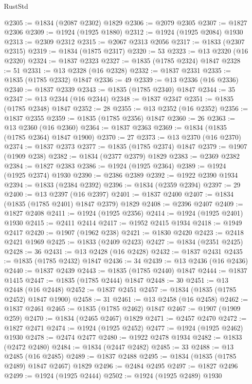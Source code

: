 \begin{lexlean}{RustStd}
\begin{coremodule}
@2305 := @1834 (@2087 @2302) @1829
@2306 := @2079 @2305
@2307 := @1827 @2306
@2309 := @1924 (@1925 @1880)
@2312 := @1924 (@1925 @2084) @1930
@2313 := @2309 @2312
@2315 := @2067 @2313 @2056
@2317 := @1833 (@2307 @2315)
@2319 := @1834 (@1875 @2317)
@2320 := 53
@2323 := @13 @2320 (@16 @2320)
@2324 := @1837 @2323
@2327 := @1835 (@1785 @2324) @1847
@2328 := 51
@2331 := @13 @2328 (@16 @2328)
@2332 := @1837 @2331
@2335 := @1835 (@1785 @2332) @1847
@2336 := 49
@2339 := @13 @2336 (@16 @2336)
@2340 := @1837 @2339
@2343 := @1835 (@1785 @2340) @1847
@2344 := 35
@2347 := @13 @2344 (@16 @2344)
@2348 := @1837 @2347
@2351 := @1835 (@1785 @2348) @1847
@2352 := 28
@2355 := @13 @2352 (@16 @2352)
@2356 := @1837 @2355
@2359 := @1835 (@1785 @2356) @1847
@2360 := 26
@2363 := @13 @2360 (@16 @2360)
@2364 := @1837 @2363
@2369 := @1834 (@1835 (@1785 @2364) @1847 @1900)
@2370 := 27
@2373 := @13 @2370 (@16 @2370)
@2374 := @1837 @2373
@2377 := @1835 (@1785 @2374) @1847
@2379 := @1907 (@1909 @238)
@2382 := @1834 (@2377 @2379) @1829
@2383 := @2369 @2382
@2384 := @1827 @2383
@2386 := @1924 (@1925 @2364)
@2389 := @1924 (@1925 @2374) @1930
@2390 := @2386 @2389
@2392 := @1922 @2390 @1934
@2394 := @1833 (@2384 @2392)
@2396 := @1834 (@2359 @2394)
@2397 := 29
@2400 := @13 @2397 (@16 @2397)
@2401 := @1837 @2400
@2407 := @1834 (@1835 (@1785 @2401) @1847 @2379) @1829
@2408 := @2396 @2407
@2409 := @1827 @2408
@2411 := @1924 (@1925 @2356)
@2414 := @1924 (@1925 @2401) @1930
@2415 := @2411 @2414
@2417 := @1952 @2415 @1934
@2418 := @1949 @2417
@2420 := @1907 (@1962 @238)
@2421 := @1830 @2420
@2423 := @2418 @2421 @1969
@2425 := @1833 (@2409 @2423)
@2427 := @1834 (@2351 @2425)
@2428 := 36
@2431 := @13 @2428 (@16 @2428)
@2432 := @1837 @2431
@2435 := @1835 (@1785 @2432) @1847
@2436 := 34
@2439 := @13 @2436 (@16 @2436)
@2440 := @1837 @2439
@2443 := @1835 (@1785 @2440) @1847
@2444 := @1837 @1415
@2447 := @1835 (@1785 @2444) @1847
@2448 := 30
@2451 := @13 @2448 (@16 @2448)
@2452 := @1837 @2451
@2457 := @1834 (@1835 (@1785 @2452) @1847 @1900)
@2458 := 31
@2461 := @13 @2458 (@16 @2458)
@2462 := @1837 @2461
@2465 := @1835 (@1785 @2462) @1847
@2467 := @1907 (@1909 @259)
@2470 := @1834 (@2465 @2467) @1829
@2471 := @2457 @2470
@2472 := @1827 @2471
@2474 := @1924 (@1925 @2452)
@2477 := @1924 (@1925 @2462) @1930
@2478 := @2474 @2477
@2480 := @1922 @2478 @1934
@2482 := @1833 (@2472 @2480)
@2484 := @1834 (@2447 @2482)
@2485 := 33
@2488 := @13 @2485 (@16 @2485)
@2489 := @1837 @2488
@2495 := @1834 (@1835 (@1785 @2489) @1847 @2467) @1829
@2496 := @2484 @2495
@2497 := @1827 @2496
@2499 := @1924 (@1925 @2444)
@2502 := @1924 (@1925 @2489) @1930

\end{coremodule}
\end{lexlean}
